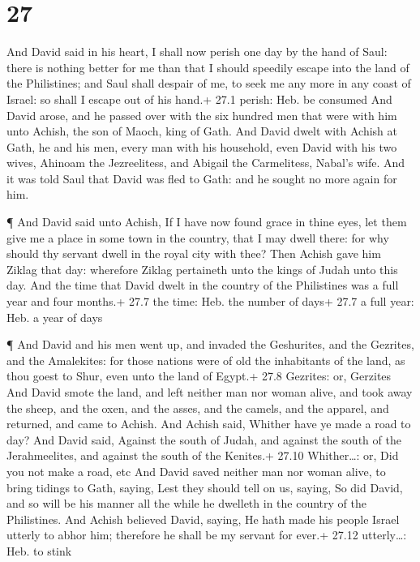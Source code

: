 \hypertarget{section-26}{%
\section{27}\label{section-26}}

 And David said in his heart, I shall now perish one day by
the hand of Saul: there is nothing better for me than that I should
speedily escape into the land of the Philistines; and Saul shall despair
of me, to seek me any more in any coast of Israel: so shall I escape out
of his hand.+ 27.1 perish: Heb. be consumed  And David
arose, and he passed over with the six hundred men that were with him
unto Achish, the son of Maoch, king of Gath.  And David
dwelt with Achish at Gath, he and his men, every man with his household,
even David with his two wives, Ahinoam the Jezreelitess, and Abigail the
Carmelitess, Nabal's wife.  And it was told Saul that David
was fled to Gath: and he sought no more again for him.

 ¶ And David said unto Achish, If I have now found grace in
thine eyes, let them give me a place in some town in the country, that I
may dwell there: for why should thy servant dwell in the royal city with
thee?  Then Achish gave him Ziklag that day: wherefore
Ziklag pertaineth unto the kings of Judah unto this day. 
And the time that David dwelt in the country of the Philistines was a
full year and four months.+ 27.7 the time: Heb. the number of days+ 27.7
a full year: Heb. a year of days

 ¶ And David and his men went up, and invaded the
Geshurites, and the Gezrites, and the Amalekites: for those nations were
of old the inhabitants of the land, as thou goest to Shur, even unto the
land of Egypt.+ 27.8 Gezrites: or, Gerzites  And David smote
the land, and left neither man nor woman alive, and took away the sheep,
and the oxen, and the asses, and the camels, and the apparel, and
returned, and came to Achish.  And Achish said, Whither
have ye made a road to day? And David said, Against the south of Judah,
and against the south of the Jerahmeelites, and against the south of the
Kenites.+ 27.10 Whither\ldots: or, Did you not make a road, etc
 And David saved neither man nor woman alive, to bring
tidings to Gath, saying, Lest they should tell on us, saying, So did
David, and so will be his manner all the while he dwelleth in the
country of the Philistines.  And Achish believed David,
saying, He hath made his people Israel utterly to abhor him; therefore
he shall be my servant for ever.+ 27.12 utterly\ldots: Heb. to stink

